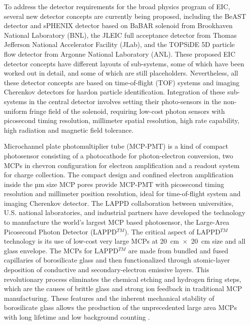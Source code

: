 \documentclass[preprint,5p]{elsarticle}
\begin{document}
To address the detector requirements for the broad physics program of EIC, 
several new detector concepts are currently being proposed, including the BeAST 
detector \cite{3} and sPHENIX detector based on BaBAR solenoid \cite{4} from 
Brookhaven National Laboratory (BNL), the JLEIC full acceptance detector 
\cite{5} from Thomas Jefferson National Accelerator Facility (JLab), and the 
TOPSiDE 5D particle flow detector \cite{6} from Argonne National Laboratory 
(ANL).  These proposed EIC detector concepts have different layouts of 
sub-systems, some of which have been worked out in detail, and some of which 
are still placeholders.  Nevertheless, all these detector concepts are based on 
time-of-flight (TOF) systems and imaging Cherenkov detectors for hardon 
particle identification.  Integration of these sub-systems in the central 
detector involves setting their photo-sensors in the non-uniform fringe field 
of the solenoid, requiring low-cost photon sensors with picosecond timing 
resolution, millimeter spatial resolution, high rate capability, high radiation 
and magnetic field tolerance.

Microchannel plate photomultiplier tube (MCP-PMT) \cite{7} is a kind of compact 
photosensor consisting of a photocathode for photon-electron conversion, two 
MCPs in chevron configuration for electron amplification and a readout system 
for charge collection. The compact design and confined electron amplification 
inside the µm size MCP pores provide MCP-PMT with picosecond timing resolution 
and millimeter position resolution, ideal for time-of-flight system and imaging 
Cherenkov detector. The LAPPD collaboration \cite{8} between universities, U.S.  
national laboratories, and industrial partners have developed the technology to 
manufacture the world’s largest MCP based photosensor, the Large-Area 
Picosecond Photon Detector (LAPPD$^{TM}$). The critical aspect of LAPPD$^{TM}$ 
technology is its use of low-cost very large MCPs \cite{9} at 
20~cm~$\times$~20~cm size and all glass envelope. The MCPs for LAPPD$^{TM}$ are 
made from bundled and fused capillaries of borosilicate glass and then 
functionalized through atomic-layer deposition \cite{10,11,12} of conductive 
and secondary-electron emissive layers.  This revolutionary process eliminates 
the chemical etching and hydrogen firing steps, which are the causes of brittle 
glass and strong ion feedback in traditional MCP manufacturing. These features 
and the inherent mechanical stability of borosilicate glass allows the 
production of the unprecedented large area MCPs with long lifetime \cite{13} 
and low background counting \cite{14}. 
\end{document}
